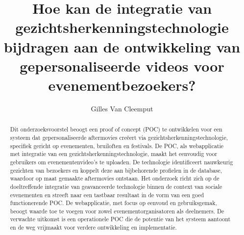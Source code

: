 \documentclass{hogent-article}
\title{Hoe kan de integratie van gezichtsherkenningstechnologie bijdragen aan de ontwikkeling van gepersonaliseerde videos voor evenementbezoekers?}
\author{Gilles Van Cleemput}
\begin{document}
\begin{abstract}
  Dit onderzoeksvoorstel beoogt een proof of concept (POC) te ontwikkelen voor een systeem dat gepersonaliseerde aftermovies creëert via gezichtsherkenningstechnologie,
  specifiek gericht op evenementen, bruiloften en festivals. De POC, als webapplicatie met integratie van een gezichtsherkenningstechnologie,
  maakt het eenvoudig voor gebruikers om evenementenvideo's te uploaden. De technologie identificeert nauwkeurig gezichten van bezoekers en koppelt deze aan bijbehorende
  profielen in de database, waardoor op maat gemaakte aftermovies ontstaan.
  Het onderzoek richt zich op de doeltreffende integratie van geavanceerde technologie binnen de
  context van sociale evenementen en streeft naar een tastbaar resultaat in de vorm van een goed functionerende POC.
  De webapplicatie, met focus op eenvoud en gebruiksgemak, beoogt waarde toe te voegen voor zowel evenementorganisatoren als deelnemers.
  De verwachte uitkomst is een operationele POC die de potentie van het systeem aantoont en de weg vrijmaakt voor verdere ontwikkeling en implementatie.
\end{abstract}

\tableofcontents



\printbibliography[heading=bibintoc]
\end{document}
